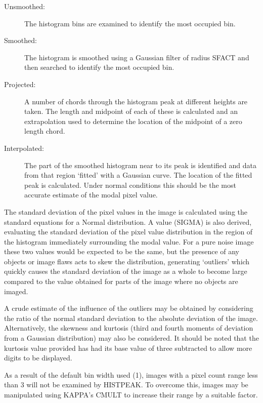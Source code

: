 \documentclass[twoside,11pt]{article}
\newcommand{\xref}[3]{#1}
\begin{document}
\begin{description}
\item[Unsmoothed:]
               The histogram bins are examined to identify the most
               occupied bin.
\item[Smoothed:]
               The histogram is smoothed using a Gaussian filter of radius
               SFACT and then searched to identify the most occupied bin.
\item[Projected:]
               A number of chords through the histogram peak at different
               heights are taken. The length and midpoint of each of these is
               calculated and an extrapolation used to determine the 
               location of the midpoint of a zero length chord. 
\item[Interpolated:]
               The part of the smoothed histogram near to its peak is 
               identified and data from that region `fitted' with a 
               Gaussian curve. The location of the fitted peak is
               calculated. Under normal conditions this should be
               the most accurate estimate of the modal pixel value.
\end{description}

The standard deviation of the pixel values in the image is
calculated using the standard equations for a Normal distribution. 
A value (SIGMA) is also derived, evaluating the standard deviation of the 
pixel value distribution in the region of the histogram immediately 
surrounding the 
modal value. For a pure noise image these two values would be expected
to be the same, but the presence of any objects or image flaws acts to
skew the distribution, generating `outliers' which quickly causes the
standard deviation of the image as a whole to become large compared to 
the value obtained for parts of the image where no objects are imaged.

A crude estimate of the influence of the outliers may be obtained by
considering the ratio of the normal standard deviation to the absolute 
deviation of the image. Alternatively, the skewness and kurtosis (third 
and fourth moments of deviation from a Gaussian distribution) may also be
considered. It should be noted that the kurtosis value provided 
has had its base value of three subtracted to allow more digits to be 
displayed.

As a result of the default bin width used (1), images with a pixel count range 
less than 3 will not be examined by HISTPEAK. To overcome this, images may be
manipulated using \xref{KAPPA}{sun95}{}'s CMULT to increase their range by a suitable factor.
\end{document}
